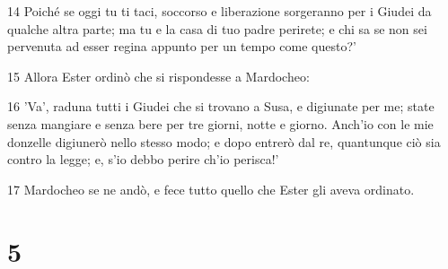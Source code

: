 \par 14 Poiché se oggi tu ti taci, soccorso e liberazione sorgeranno per i Giudei da qualche altra parte; ma tu e la casa di tuo padre perirete; e chi sa se non sei pervenuta ad esser regina appunto per un tempo come questo?'
\par 15 Allora Ester ordinò che si rispondesse a Mardocheo:
\par 16 'Va', raduna tutti i Giudei che si trovano a Susa, e digiunate per me; state senza mangiare e senza bere per tre giorni, notte e giorno. Anch'io con le mie donzelle digiunerò nello stesso modo; e dopo entrerò dal re, quantunque ciò sia contro la legge; e, s'io debbo perire ch'io perisca!'
\par 17 Mardocheo se ne andò, e fece tutto quello che Ester gli aveva ordinato.

\chapter{5}

